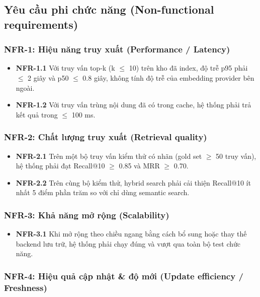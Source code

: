 \subsection{Yêu cầu phi chức năng (Non-functional requirements)}

\subsubsection*{NFR-1: Hiệu năng truy xuất (Performance / Latency)}

\begin{itemize}
  \item \textbf{NFR-1.1} Với truy vấn top-k (k $\leq$ 10) trên kho đã index, độ trễ p95 phải $\leq$ 2 giây và p50 $\leq$ 0.8 giây, không tính độ trễ của embedding provider bên ngoài.
  \item \textbf{NFR-1.2} Với truy vấn trùng nội dung đã có trong cache, hệ thống phải trả kết quả trong $\leq$ 100 ms.
\end{itemize}

\subsubsection*{NFR-2: Chất lượng truy xuất (Retrieval quality)}

\begin{itemize}
  \item \textbf{NFR-2.1} Trên một bộ truy vấn kiểm thử có nhãn (gold set $\geq$ 50 truy vấn), hệ thống phải đạt Recall@10 $\geq$ 0.85 và MRR $\geq$ 0.70.
  \item \textbf{NFR-2.2} Trên cùng bộ kiểm thử, hybrid search phải cải thiện Recall@10 ít nhất 5 điểm phần trăm so với chỉ dùng semantic search.
\end{itemize}

\subsubsection*{NFR-3: Khả năng mở rộng (Scalability)}

\begin{itemize}
  \item \textbf{NFR-3.1} Khi mở rộng theo chiều ngang bằng cách bổ sung hoặc thay thế backend lưu trữ, hệ thống phải chạy đúng và vượt qua toàn bộ test chức năng.
\end{itemize}

\subsubsection*{NFR-4: Hiệu quả cập nhật \& độ mới (Update efficiency / Freshness)}

